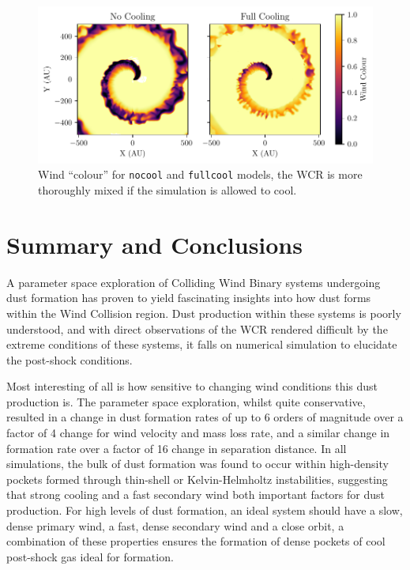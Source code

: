 \begin{figure}
  \centering
  \includegraphics{assets/results/radiative/radiative-r0.pdf}
  \caption[Wind mixing due to radiative methods]{Wind ``colour'' for \texttt{nocool} and \texttt{fullcool} models, the WCR is more thoroughly mixed if the simulation is allowed to cool.}
  \label{fig:radiative-windmixing}
\end{figure}

\section{Summary and Conclusions}

A parameter space exploration of Colliding Wind Binary systems undergoing dust formation has proven to yield fascinating insights into how dust forms within the Wind Collision region.
Dust production within these systems is poorly understood, and with direct observations of the WCR rendered difficult by the extreme conditions of these systems, it falls on numerical simulation to elucidate the post-shock conditions.

Most interesting of all is how sensitive to changing wind conditions this dust production is.
The parameter space exploration, whilst quite conservative, resulted in a change in dust formation rates of up to 6 orders of magnitude over a factor of 4 change for wind velocity and mass loss rate, and a similar change in formation rate over a factor of 16 change in separation distance.
In all simulations, the bulk of dust formation was found to occur within high-density pockets formed through thin-shell or Kelvin-Helmholtz instabilities, suggesting that strong cooling and a fast secondary wind both important factors for dust production.
For high levels of dust formation, an ideal system should have a slow, dense primary wind, a fast, dense secondary wind and a close orbit, a combination of these properties ensures the formation of dense pockets of cool post-shock gas ideal for formation.

